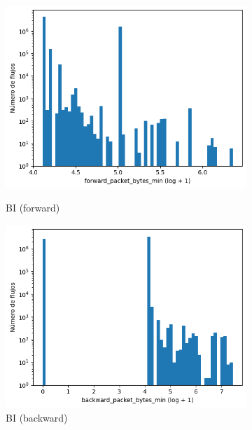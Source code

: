 \begin{figure}[H]
\begin{subfigure}[b]{0.26\textwidth}
        \includegraphics[width=\textwidth]{media/packet_pincer_botiot/forward_packet_bytes_min_log_x_log_y.png}
        \caption{BI (forward)}
        \includegraphics[width=\textwidth]{media/packet_pincer_botiot/backward_packet_bytes_min_log_x_log_y.png}
        \caption{BI (backward)}
    \end{subfigure}
    \hfill
    \begin{subfigure}[b]{0.26\textwidth}
        \centering

\end{subfigure}
\end{figure}

